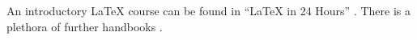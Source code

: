 
\usepackage[style=numeric, citestyle=alpha, backend=biber]{biblatex}



An introductory \LaTeX{} course can be found in \enquote{\LaTeX{} in 24 Hours} \parencite{datta2017}.
There is a plethora of further handbooks \cite*[e.\,g.,][]{goossensmittelbach2010}.

\printbibliography